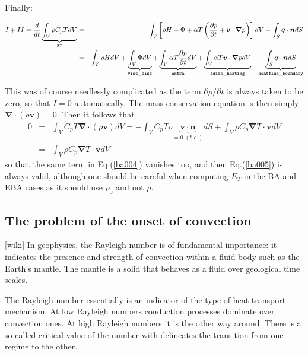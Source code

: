 Finally:

\begin{eqnarray}
I+II=\frac{d}{dt} \underbrace{\int_V \rho C_p T dV }_{\tt ET}
 &=& 
 \int_V \left[ 
 \rho H  + \Phi    +\alpha T \left( \frac{\partial p}{\partial t}+  \bm v \cdot {\bm \nabla} p \right) \right]  dV 
- \int_S  {\bm q} \cdot {\bm n}  dS \\ 
 &=& 
 \int_V \rho H dV 
+\underbrace{\int_V \Phi  dV}_{\tt visc\_diss}  
+\underbrace{\int_V \alpha T \frac{\partial p}{\partial t} dV}_{\tt extra}
+\underbrace{\int_V \alpha T \bm v \cdot {\bm \nabla} p  dV}_{\tt adiab\_heating} 
- \underbrace{\int_S  {\bm q} \cdot {\bm n}  dS}_{\tt heatflux\_boundary} \label{ba005}
\end{eqnarray}

This was of course needlessly complicated as the term $\partial \rho/\partial t$ is always 
taken to be zero, so that $I=0$ automatically. The mass conservation equation is then 
simply ${\bm \nabla}\cdot (\rho {\bm v})=0$. Then it follows that 
\begin{eqnarray}
0&=& \int_V C_p T {\bm \nabla} \cdot (\rho {\bm v}) dV
=
-\int_V C_p T \rho \underbrace{{\bm v} \cdot {\bm n}}_{=0 \; (b.c.)} dS +  \int_V \rho C_p  {\bm \nabla}  T \cdot {\bm v} dV \\
&=&  \int_V \rho C_p  {\bm \nabla}  T \cdot {\bm v} dV 
\end{eqnarray}
so that the same term in Eq.(\ref{ba004}) vanishes too, and then Eq.(\ref{ba005}) is always valid, although one should be careful when computing $E_T$ in the BA and EBA cases as it should use $\rho_0$ and not $\rho$.


\subsection{The problem of the onset of convection}

[wiki] In geophysics, the Rayleigh number is of fundamental importance: it indicates the presence and strength of convection within a fluid body such as the Earth's mantle. The mantle is a solid that behaves as a fluid over geological time scales.

 The Rayleigh number essentially is an indicator of the type of heat transport mechanism. At low Rayleigh numbers conduction processes dominate over convection ones. At high Rayleigh numbers it is the other way around. There is a so-called critical value of the number with delineates the transition from one regime to the other. 

